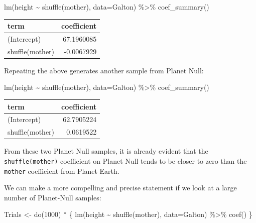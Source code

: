 \documentclass[
  letterpaper,
  DIV=11,
  numbers=noendperiod,
  oneside]{scrreprt}
\newenvironment{Shaded}{\begin{snugshade}}{\end{snugshade}}
\newcommand{\AttributeTok}[1]{\textcolor[rgb]{0.40,0.45,0.13}{#1}}
\newcommand{\DecValTok}[1]{\textcolor[rgb]{0.68,0.00,0.00}{#1}}
\newcommand{\FunctionTok}[1]{\textcolor[rgb]{0.28,0.35,0.67}{#1}}
\newcommand{\NormalTok}[1]{\textcolor[rgb]{0.00,0.23,0.31}{#1}}
\newcommand{\OtherTok}[1]{\textcolor[rgb]{0.00,0.23,0.31}{#1}}
\newcommand{\SpecialCharTok}[1]{\textcolor[rgb]{0.37,0.37,0.37}{#1}}
\begin{document}
\begin{Shaded}
\begin{Highlighting}[]
\FunctionTok{lm}\NormalTok{(height }\SpecialCharTok{\textasciitilde{}} \FunctionTok{shuffle}\NormalTok{(mother), }\AttributeTok{data=}\NormalTok{Galton) }\SpecialCharTok{\%\textgreater{}\%} \FunctionTok{coef\_summary}\NormalTok{()}
\end{Highlighting}
\end{Shaded}

\ttfamily 
\begin{tabular}{lr}
\toprule
term & coefficient\\
\midrule
(Intercept) & 67.1960085\\
shuffle(mother) & -0.0067929\\
\bottomrule
\end{tabular} \normalfont
\bigskip

Repeating the above generates another sample from Planet Null:

\begin{Shaded}
\begin{Highlighting}[]
\FunctionTok{lm}\NormalTok{(height }\SpecialCharTok{\textasciitilde{}} \FunctionTok{shuffle}\NormalTok{(mother), }\AttributeTok{data=}\NormalTok{Galton) }\SpecialCharTok{\%\textgreater{}\%} \FunctionTok{coef\_summary}\NormalTok{()}
\end{Highlighting}
\end{Shaded}

\ttfamily 
\begin{tabular}{lr}
\toprule
term & coefficient\\
\midrule
(Intercept) & 62.7905224\\
shuffle(mother) & 0.0619522\\
\bottomrule
\end{tabular} \normalfont
\bigskip

From these two Planet Null samples, it is already evident that the
\texttt{shuffle(mother)} coefficient on Planet Null tends to be closer
to zero than the \texttt{mother} coefficient from Planet Earth.

We can make a more compelling and precise statement if we look at a
large number of Planet-Null samples:

\begin{Shaded}
\begin{Highlighting}[]
\NormalTok{Trials }\OtherTok{\textless{}{-}} \FunctionTok{do}\NormalTok{(}\DecValTok{1000}\NormalTok{) }\SpecialCharTok{*}\NormalTok{ \{}
  \FunctionTok{lm}\NormalTok{(height }\SpecialCharTok{\textasciitilde{}} \FunctionTok{shuffle}\NormalTok{(mother), }\AttributeTok{data=}\NormalTok{Galton) }\SpecialCharTok{\%\textgreater{}\%} \FunctionTok{coef}\NormalTok{()}
\NormalTok{\}}
\end{Highlighting}
\end{Shaded}
\end{document}
